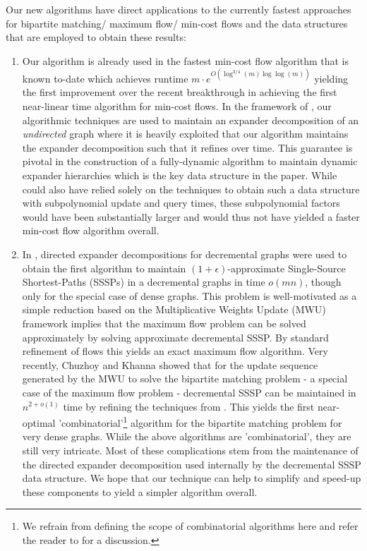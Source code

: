 \documentclass[11pt]{article}
\begin{document}
Our new algorithms have direct applications to the currently fastest approaches for bipartite matching/ maximum flow/ min-cost flows and the data structures that are employed to obtain these results:
\begin{enumerate}
    \item Our algorithm is already used in the fastest min-cost flow algorithm that is known to-date \cite{vdB2024decrMincost} which achieves runtime $m \cdot e^{O(\log^{3/4}(m) \log\log(m))}$ yielding the first improvement over the recent breakthrough in \cite{chen2022maximum} achieving the first near-linear time algorithm for min-cost flows. In the framework of \cite{vdB2024decrMincost}, our algorithmic techniques are used to maintain an expander decomposition of an \emph{undirected} graph where it is heavily exploited that our algorithm maintains the expander decomposition such that it refines over time. This guarantee is pivotal in the construction of a fully-dynamic algorithm to maintain dynamic expander hierarchies which is the key data structure in the paper. While \cite{vdB2024decrMincost} could also have relied solely on the techniques \cite{hua2023maintaining} to obtain such a data structure with subpolynomial update and query times, these subpolynomial factors would have been substantially larger and would thus not have yielded a faster min-cost flow algorithm overall.

    \item In \cite{bernstein2020deterministic},  directed expander decompositions for decremental graphs were used to obtain the first algorithm to maintain $(1+\epsilon)$-approximate Single-Source Shortest-Paths (SSSPs) in a decremental graphs in time $o(mn)$, though only for the special case of dense graphs. This problem is well-motivated as a simple reduction based on the Multiplicative Weights Update (MWU) framework implies that the maximum flow problem can be solved approximately by solving approximate decremental SSSP. By standard refinement of flows this yields an exact maximum flow algorithm. Very recently, Chuzhoy and Khanna \cite{chuzhoy2024faster, chuzhoy2024maximum} showed that for the update sequence generated by the MWU to solve the bipartite matching problem - a special case of the maximum flow problem - decremental SSSP can be maintained in $n^{2+o(1)}$ time by refining the techniques from \cite{bernstein2020near, bernstein2020deterministic}. This yields the first near-optimal 'combinatorial'\footnote{We refrain from defining the scope of combinatorial algorithms here and refer the reader to \cite{chuzhoy2024faster, chuzhoy2024maximum} for a discussion.} algorithm for the bipartite matching problem for very dense graphs. While the above algorithms are 'combinatorial', they are still very intricate. Most of these complications stem from the maintenance of the directed expander decomposition used internally by the decremental SSSP data structure. We hope that our technique can help to simplify and speed-up these components to yield a simpler algorithm overall.


\end{enumerate}
\end{document}
